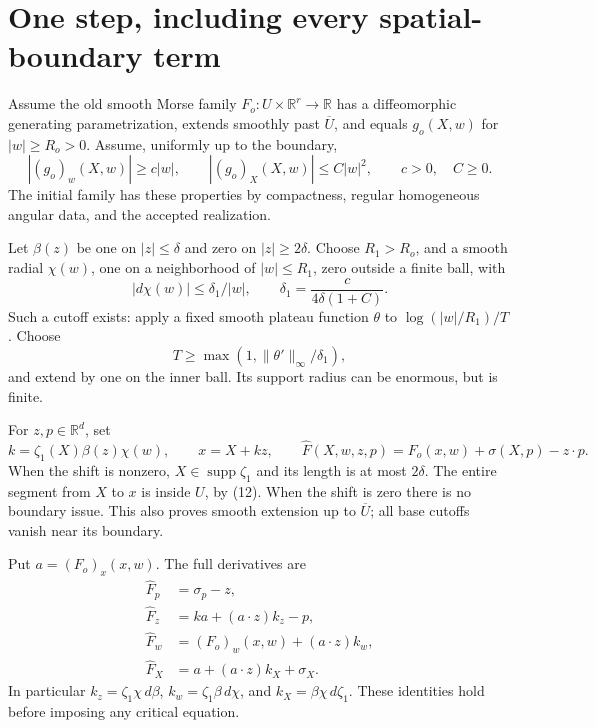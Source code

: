 \documentclass[11pt]{article}
\newcommand{\R}{\mathbb R}
\newcommand{\supp}{\operatorname{supp}}
\begin{document}
\section{One step, including every spatial-boundary term}

Assume the old smooth Morse family \(F_o:U\times\R^r\to\R\)
has a diffeomorphic generating parametrization, extends smoothly
past \(\overline U\), and equals \(g_o(X,w)\) for \(|w|\geq R_o>0\).
Assume, uniformly up to the boundary,
\[
 |(g_o)_w(X,w)|\geq c|w|,\qquad
 |(g_o)_X(X,w)|\leq C|w|^2,\qquad c>0,\quad C\geq0.
 \tag{14}
\]
The initial family has these properties by compactness, regular
homogeneous angular data, and the accepted realization.

Let \(\beta(z)\) be one on \(|z|\leq\delta\) and zero on
\(|z|\geq2\delta\). Choose \(R_1>R_o\), and a smooth radial
\(\chi(w)\), one on a neighborhood of \(|w|\leq R_1\),
zero outside a finite ball, with
\[
 |d\chi(w)|\leq\delta_1/|w|,\qquad
 \delta_1=\frac{c}{4\delta(1+C)}.
 \tag{15}
\]
Such a cutoff exists: apply a fixed smooth plateau function
\(\theta\) to \(\log(|w|/R_1)/T\). Choose
\[
 T\geq\max(1,\|\theta'\|_\infty/\delta_1),
\]
and extend by one on the inner ball.
Its support radius can be enormous, but is finite.

For \(z,p\in\R^d\), set
\[
 k=\zeta_1(X)\beta(z)\chi(w),\qquad x=X+kz,\qquad
 \widehat F(X,w,z,p)=F_o(x,w)+\sigma(X,p)-z\cdot p.
 \tag{16}
\]
When the shift is nonzero, \(X\in\supp\zeta_1\) and its length
is at most \(2\delta\). The entire segment from \(X\) to \(x\)
is inside \(U\), by (12). When the shift is zero there is no
boundary issue. This also proves smooth extension up to
\(\overline U\); all base cutoffs vanish near its boundary.

Put \(a=(F_o)_x(x,w)\). The full derivatives are
\begin{align}
 \widehat F_p&=\sigma_p-z, \tag{17}\\
 \widehat F_z&=ka+(a\cdot z)k_z-p, \tag{18}\\
 \widehat F_w&=(F_o)_w(x,w)+(a\cdot z)k_w, \tag{19}\\
 \widehat F_X&=a+(a\cdot z)k_X+\sigma_X. \tag{20}
\end{align}
In particular
\(k_z=\zeta_1\chi\,d\beta\),
\(k_w=\zeta_1\beta\,d\chi\), and
\(k_X=\beta\chi\,d\zeta_1\).
These identities hold before imposing any critical equation.
\end{document}
